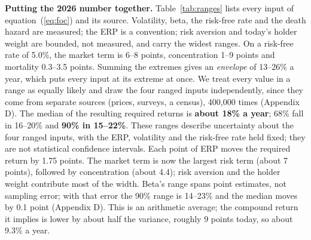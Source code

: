 \documentclass[11pt]{article}
\begin{document}
\textbf{Putting the 2026 number together.} Table~\ref{tab:ranges} lists every input of equation~(\ref{eq:foc}) and its source. Volatility, beta, the risk-free rate and the death hazard are measured; the ERP is a convention; risk aversion and today's holder weight are bounded, not measured, and carry the widest ranges. On a risk-free rate of 5.0\%, the market term is 6--8 points, concentration 1--9 points and mortality 0.3--3.5 points. Summing the extremes gives an \emph{envelope} of 13--26\% a year, which puts every input at its extreme at once. We treat every value in a range as equally likely and draw the four ranged inputs independently, since they come from separate sources (prices, surveys, a census), 400,000 times (Appendix D). The median of the resulting required returns is \textbf{about 18\% a year}; 68\% fall in 16--20\% and \textbf{90\% in 15--22\%}. These ranges describe uncertainty about the four ranged inputs, with the ERP, volatility and the risk-free rate held fixed; they are not statistical confidence intervals. Each point of ERP moves the required return by 1.75 points. The market term is now the largest risk term (about 7 points), followed by concentration (about 4.4); risk aversion and the holder weight contribute most of the width. Beta's range spans point estimates, not sampling error; with that error the 90\% range is 14--23\% and the median moves by 0.1 point (Appendix D). This is an arithmetic average; the compound return it implies is lower by about half the variance, roughly 9 points today, so about 9.3\% a year.
\end{document}
